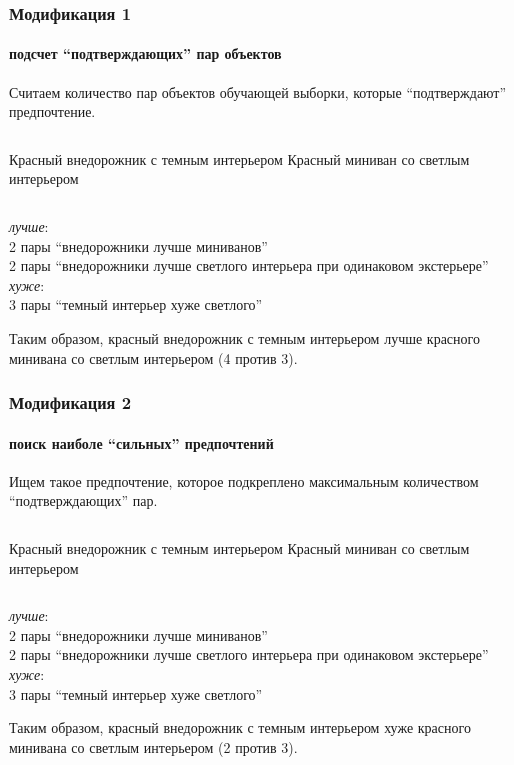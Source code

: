 \documentclass[xcolor=table]{beamer}
\theoremstyle{definition}
\begin{document}
	\begin{frame}
		\frametitle{Модификация 1}
		\framesubtitle{подсчет ``подтверждающих'' пар объектов}
		Считаем количество пар объектов обучающей выборки, которые ``подтверждают'' предпочтение. 
		\vspace{1.4em}
		\begin{columns}[c] 
			Красный внедорожник с темным интерьером
			Красный миниван со светлым интерьером
		\end{columns}
		\begin{center}
			\vspace{0.5em}
			\emph{лучше}: \\ 
			2 пары ``внедорожники лучше миниванов'' \\
			2 пары ``внедорожники лучше светлого интерьера при одинаковом экстерьере'' \\
			\vspace{1em}
			\emph{хуже}: \\
			3 пары ``темный интерьер хуже светлого''
		\end{center}
		
		\vspace{1.5em}
		Таким образом, красный внедорожник с темным интерьером {\color{green} лучше} красного минивана со светлым интерьером (4 против 3).
	\end{frame}
	
	\begin{frame}
		\frametitle{Модификация 2}
		\framesubtitle{поиск наиболе ``сильных'' предпочтений}
		Ищем такое предпочтение, которое подкреплено максимальным количеством ``подтверждающих'' пар.
		\vspace{1.4em}
		\begin{columns}[c] 
			\column{.5\textwidth} 
			Красный внедорожник с темным интерьером
			\column{.5\textwidth}
			Красный миниван со светлым интерьером
		\end{columns}
		\begin{center}
			\vspace{0.5em}
			\emph{лучше}: \\ 
			2 пары ``внедорожники лучше миниванов'' \\
			2 пары ``внедорожники лучше светлого интерьера при одинаковом экстерьере'' \\
			\vspace{1em}
			\emph{хуже}: \\
			3 пары ``темный интерьер хуже светлого''
		\end{center}
		
		\vspace{1.5em}
		Таким образом, красный внедорожник с темным интерьером {\color{red} хуже} красного минивана со светлым интерьером (2 против 3).
	\end{frame}
	
\end{document}
